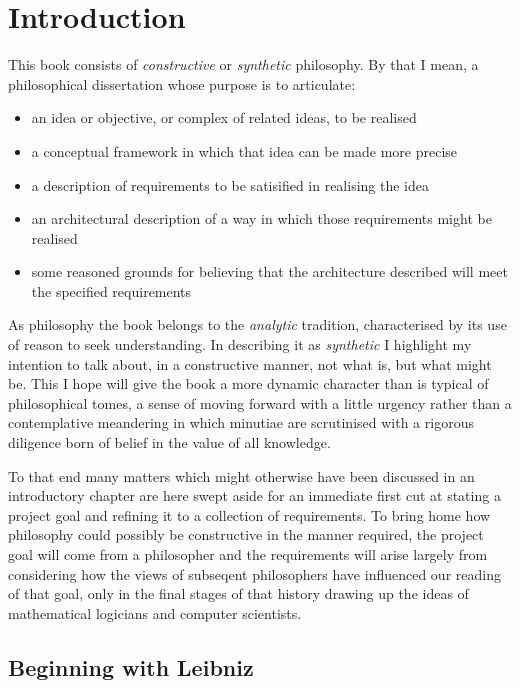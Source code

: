 
\chapter{Introduction}\label{IntroductionA}


This book consists of {\it constructive} or {\it synthetic} philosophy.
By that I mean, a philosophical dissertation whose purpose is to articulate:

\begin{itemize}
\item an idea or objective, or complex of related ideas, to be realised
\item a conceptual framework in which that idea can be made more precise
\item a description of requirements to be satisified in realising the idea
\item an architectural description of a way in which those requirements might be realised
\item some reasoned grounds for believing that the architecture described will meet the specified requirements
\end{itemize}

As philosophy the book belongs to the {\it analytic} tradition, characterised by its use of reason to seek understanding.
In describing it as {\it synthetic} I highlight my intention to talk about, in a constructive manner, not what is, but what might be.
This I hope will give the book a more dynamic character than is typical of philosophical tomes, a sense of moving forward with a little urgency rather than a contemplative meandering in which minutiae are scrutinised with a rigorous diligence born of belief in the value of all knowledge.

To that end many matters which might otherwise have been discussed in an introductory chapter are here swept aside for an immediate first cut at stating a project goal and refining it to a collection of requirements.
To bring home how philosophy could possibly be constructive in the manner required, the project goal will come from a philosopher and the requirements will arise largely from considering how the views of subseqent philosophers have influenced our reading of that goal, only in the final stages of that history drawing up the ideas of mathematical logicians and computer scientists.

\section{Beginning with Leibniz}

